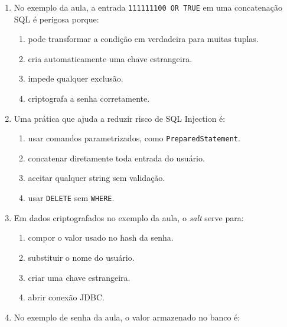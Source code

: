 \documentclass[12pt,a4paper]{article}
\begin{document}
\begin{enumerate}[label=\textbf{Q\arabic*.}]
\begin{enumerate}[label=\alph*)]
    \item uso de strings maliciosas.
    \item uso obrigatório de chaves primárias.
    \item criação de índices.
    \item normalização até BCNF.
\end{enumerate}

\item No exemplo da aula, a entrada \texttt{111111100 OR TRUE} em uma concatenação SQL é perigosa porque:

\begin{enumerate}[label=\alph*)]
    \item pode transformar a condição em verdadeira para muitas tuplas.
    \item cria automaticamente uma chave estrangeira.
    \item impede qualquer exclusão.
    \item criptografa a senha corretamente.
\end{enumerate}

\item Uma prática que ajuda a reduzir risco de SQL Injection é:

\begin{enumerate}[label=\alph*)]
    \item usar comandos parametrizados, como \texttt{PreparedStatement}.
    \item concatenar diretamente toda entrada do usuário.
    \item aceitar qualquer string sem validação.
    \item usar \texttt{DELETE} sem \texttt{WHERE}.
\end{enumerate}

\item Em dados criptografados no exemplo da aula, o \textit{salt} serve para:

\begin{enumerate}[label=\alph*)]
    \item compor o valor usado no hash da senha.
    \item substituir o nome do usuário.
    \item criar uma chave estrangeira.
    \item abrir conexão JDBC.
\end{enumerate}

\item No exemplo de senha da aula, o valor armazenado no banco é:


\end{enumerate}
\end{document}
